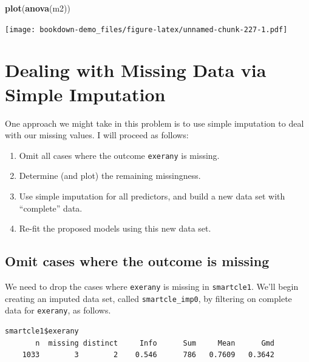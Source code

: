 \documentclass[]{book}
\newenvironment{Shaded}{\begin{snugshade}}{\end{snugshade}}
\newcommand{\KeywordTok}[1]{\textcolor[rgb]{0.13,0.29,0.53}{\textbf{#1}}}
\newcommand{\OperatorTok}[1]{\textcolor[rgb]{0.81,0.36,0.00}{\textbf{#1}}}
\newcommand{\NormalTok}[1]{#1}
\providecommand{\tightlist}{%
  \setlength{\itemsep}{0pt}\setlength{\parskip}{0pt}}
\theoremstyle{definition}
\theoremstyle{definition}
\theoremstyle{definition}
\theoremstyle{remark}
\begin{document}
\begin{Shaded}
\begin{Highlighting}[]
\KeywordTok{plot}\NormalTok{(}\KeywordTok{anova}\NormalTok{(m2))}
\end{Highlighting}
\end{Shaded}

\texttt{[image: bookdown-demo\_files/figure-latex/unnamed-chunk-227-1.pdf]}

\section{Dealing with Missing Data via Simple
Imputation}\label{dealing-with-missing-data-via-simple-imputation}

One approach we might take in this problem is to use simple imputation
to deal with our missing values. I will proceed as follows:

\begin{enumerate}
\def\labelenumi{\arabic{enumi}.}
\tightlist
\item
  Omit all cases where the outcome \texttt{exerany} is missing.
\item
  Determine (and plot) the remaining missingness.
\item
  Use simple imputation for all predictors, and build a new data set
  with ``complete'' data.
\item
  Re-fit the proposed models using this new data set.
\end{enumerate}

\subsection{Omit cases where the outcome is
missing}\label{omit-cases-where-the-outcome-is-missing}

We need to drop the cases where \texttt{exerany} is missing in
\texttt{smartcle1}. We'll begin creating an imputed data set, called
\texttt{smartcle\_imp0}, by filtering on complete data for
\texttt{exerany}, as follows.

\begin{Shaded}
\end{Shaded}

\begin{verbatim}
smartcle1$exerany 
       n  missing distinct     Info      Sum     Mean      Gmd 
    1033        3        2    0.546      786   0.7609   0.3642 
\end{verbatim}
\end{document}
